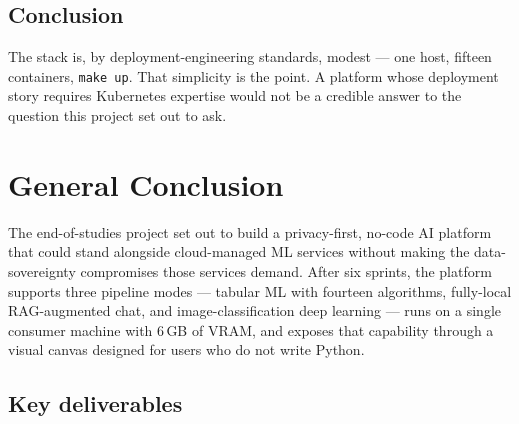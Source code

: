 \documentclass[12pt, a4paper, oneside]{report}
\begin{document}
\section*{Conclusion}

The stack is, by deployment-engineering standards, modest --- one
host, fifteen containers, \texttt{make up}. That simplicity is the
point. A platform whose deployment story requires Kubernetes
expertise would not be a credible answer to the question this
project set out to ask.

\chapter*{General Conclusion}

The end-of-studies project set out to build a privacy-first, no-code
AI platform that could stand alongside cloud-managed ML services
without making the data-sovereignty compromises those services
demand. After six sprints, the platform supports three pipeline
modes --- tabular ML with fourteen algorithms, fully-local
RAG-augmented chat, and image-classification deep learning --- runs
on a single consumer machine with $6$\,GB of VRAM, and exposes that
capability through a visual canvas designed for users who do not
write Python.

\section*{Key deliverables}
\end{document}
